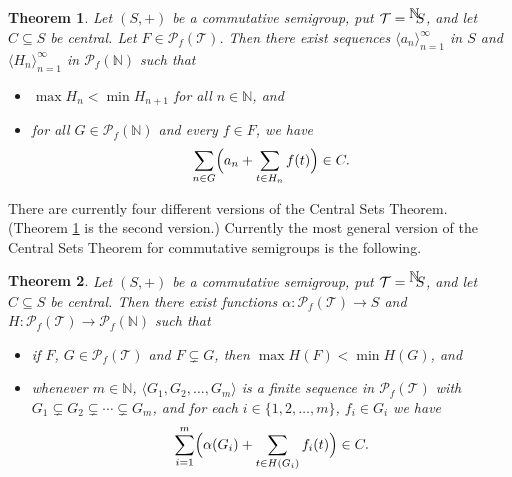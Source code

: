 \documentclass[12pt]{article}
\theoremstyle{plain}
\newtheorem{thm}{Theorem}[section]
\theoremstyle{definition}
\newcommand{\la}{\langle}
\newcommand{\ra}{\rangle}
\newcommand{\bbN}{\mathbb{N}}
\newcommand{\setfunc}[2]{\hbox{${}^{\hbox{$#1$}}\hskip -3 pt #2$}}
\begin{document}
  \begin{thm}
    \label{thm:cst2}
    Let $(S,+)$ be a commutative semigroup, put $\mathcal{T} =
    \setfunc{\bbN}{S}$, and let $C \subseteq S$ be central.
    Let $F \in \mathcal{P}_f(\mathcal{T})$. 
    Then there exist sequences $\la a_n \ra_{n=1}^\infty$ in $S$ and
    $\la H_n \ra_{n=1}^\infty$ in $\mathcal{P}_f(\bbN)$ such that
      \begin{itemize}
        \item[(1)] $\max H_n < \min H_{n+1}$ for all $n \in \bbN$, and
        \item[(2)] for all $G \in \mathcal{P}_f(\bbN)$ and every $f
          \in F$, we have
          \[
            \sum_{n \in G}\Bigl(a_n + \sum_{t \in H_n} f(t)\Bigr) \in C.
          \]
      \end{itemize}
  \end{thm}

There are currently four different versions of the Central Sets
Theorem. 
(Theorem \ref{thm:cst2} is the second version.)
Currently the most general version of the Central Sets Theorem for
commutative semigroups is the following. 

  \begin{thm}
    \label{thm:newcst}
    Let $(S,+)$ be a commutative semigroup, put $\mathcal{T} =
    \setfunc{\bbN}{S}$, and let $C \subseteq S$ be central. 
    Then there exist functions $\alpha : \mathcal{P}_f(\mathcal{T})
    \to S$ and $H : \mathcal{P}_f(\mathcal{T}) \to \mathcal{P}_f(\bbN)$ such
    that
      \begin{itemize}
        \item[(1)] if $F$, $G \in \mathcal{P}_f(\mathcal{T})$ and $F
          \subsetneq G$, then $\max H(F) < \min H(G)$, and
        \item[(2)] whenever $m \in \bbN$, $\la G_1, G_2, \ldots, G_m
          \ra$ is a finite sequence in $\mathcal{P}_f(\mathcal{T})$
          with $G_1 \subsetneq G_2 \subsetneq \cdots \subsetneq G_m$,
          and for each $i \in \{1, 2, \ldots, m\}$, $f_i \in G_i$ we
          have
          \[
            \sum_{i=1}^m\Bigl(\alpha(G_i)+\sum_{t \in H(G_i)}
            f_i(t)\Bigr) \in C.
          \]
      \end{itemize}
  \end{thm}
\end{document}
